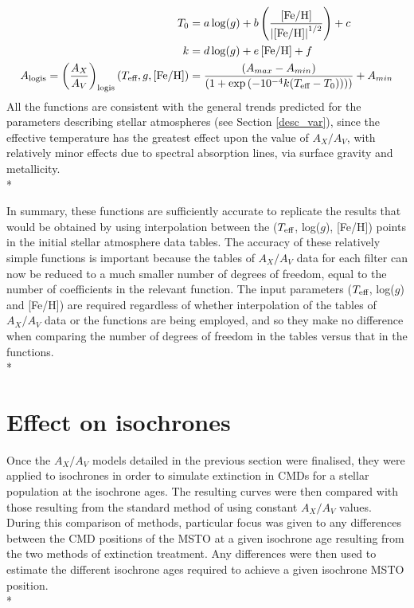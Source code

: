 \documentclass[12pt, a4paper]{report}
\begin{document}
\begin{align}
T_{\textnormal{0}} &= a\log(g) + b\left(\frac{\left[\textnormal{Fe/H}\right]}{\left|\left[\textnormal{Fe/H}\right]\right|^{1/2}}\right) + c \label{T0_eq}\\
k &= d\log(g) + e\left[\textnormal{Fe/H}\right] + f \label{decay_const_eq}\\
A_{\textnormal{logis}} = \left(\frac{A_{X}}{A_{V}}\right)_{\textnormal{logis}}(T_{\textnormal{eff}},g,\left[\textnormal{Fe/H}\right]) &= \frac{(A_{max}-A_{min})}{( 1 + \exp{(-10^{-4} k(T_{\textnormal{eff}}-T_{\textnormal{0}})) ) )}} + A_{min} \label{A_logis_UV}
\end{align}
All the functions are consistent with the general trends predicted for the parameters describing stellar atmospheres (see Section \ref{desc_var}), since the effective temperature has the greatest effect upon the value of $A_{X}/A_{V}$, with relatively minor effects due to spectral absorption lines, via surface gravity and metallicity.\\*

In summary, these functions are sufficiently accurate to replicate the results that would be obtained by using interpolation between the ($T_{\textnormal{eff}}$, log($g$), [Fe/H]) points in the initial stellar atmosphere data tables. The accuracy of these relatively simple functions is important because the tables of $A_{X}/A_{V}$ data for each filter can now be reduced to a much smaller number of degrees of freedom, equal to the number of coefficients in the relevant function. The input parameters ($T_{\textnormal{eff}}$, log($g$) and [Fe/H]) are required regardless of whether interpolation of the tables of $A_{X}/A_{V}$ data or the functions are being employed, and so they make no difference when comparing the number of degrees of freedom in the tables versus that in the functions.\\*


\section{Effect on isochrones} \label{result_CMDs}
Once the $A_{X}/A_{V}$ models detailed in the previous section were finalised, they were applied to isochrones in order to simulate extinction in CMDs for a stellar population at the isochrone ages. The resulting curves were then compared with those resulting from the standard method of using constant $A_{X}/A_{V}$ values. During this comparison of methods, particular focus was given to any differences between the CMD positions of the MSTO at a given isochrone age resulting from the two methods of extinction treatment. Any differences were then used to estimate the different isochrone ages required to achieve a given isochrone MSTO position. \\*
 
\end{document}
